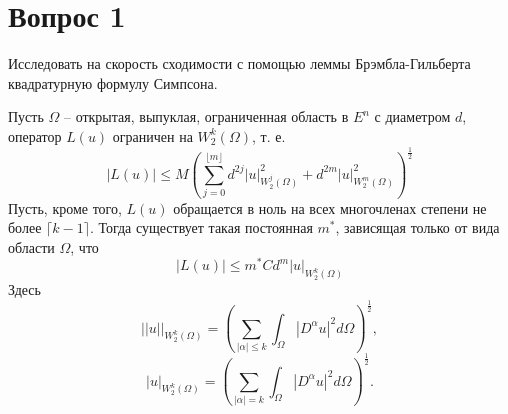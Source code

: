 \documentclass[11pt]{article}
\author{Sergey Makarov}
\date{\today}
\title{}
\newcounter{lem}\setcounter{lem}{0}
\def\lm{\par\smallskip\refstepcounter{lem}\textbf{\arabic{lem}}}
\newtheorem*{Lemma}{Лемма \lm}
\newcounter{th}\setcounter{th}{0}
\begin{document}
\section{Вопрос 1}
\label{sec:orgf0d169a}
Исследовать на скорость сходимости с помощью леммы Брэмбла-Гильберта квадратурную формулу Симпсона.

\begin{Lemma}
Пусть $\Omega$ -- открытая, выпуклая, ограниченная область в $E^n$ с диаметром $d$,
оператор $L(u)$ ограничен на $W_2^k(\Omega)$, т. е.
\begin{equation*}
|L(u)| \leq M\left(\sum_{j = 0}^{\lfloor m\rfloor}d^{2j}|u|^2_{W_2^j(\Omega)} +
d^{2m}|u|^2_{W_2^m(\Omega)}\right)^{\frac12}
\end{equation*}
Пусть, кроме того, $L(u)$ обращается в ноль на всех многочленах степени не более $\lceil k - 1\rceil$.
Тогда существует такая постоянная $m^*$, зависящая только от вида области $\Omega$, что
\begin{equation*}
|L(u)| \leq m^*Cd^m|u|_{W_2^k(\Omega)}
\end{equation*}
Здесь
\begin{equation*}
||u||_{W_2^k(\Omega)} = \left(\sum_{|\alpha| \leq k}\int_{\Omega}|D^{\alpha}u|^2d\Omega\right)^{\frac12},
\end{equation*}
\begin{equation*}
|u|_{W_2^k(\Omega)} = \left(\sum_{|\alpha| = k}\int_{\Omega}|D^{\alpha}u|^2d\Omega\right)^{\frac12}.
\end{equation*}
\end{Lemma}
\end{document}
